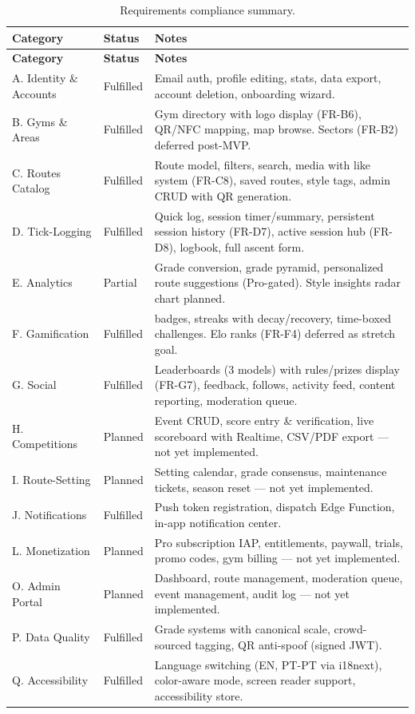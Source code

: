 \documentclass[12pt,a4paper]{report}
\renewcommand\_{\textunderscore\hspace{0pt}}
\begin{document}
\renewcommand{\arraystretch}{1.15}
\small
\begin{longtable}{l l >{\raggedright\arraybackslash}p{8.5cm}}
\caption{Requirements compliance summary.}\label{tab:compliance}\\
\hline
\textbf{Category} & \textbf{Status} & \textbf{Notes} \\
\hline
\endfirsthead
\hline
\textbf{Category} & \textbf{Status} & \textbf{Notes} \\
\hline
\endhead

A. Identity \& Accounts & Fulfilled & Email auth, profile editing, stats, data export, account deletion, onboarding wizard. \\
B. Gyms \& Areas & Fulfilled & Gym directory with logo display (FR-B6), QR/NFC mapping, map browse. Sectors (FR-B2) deferred post-MVP. \\
C. Routes Catalog & Fulfilled & Route model, filters, search, media with like system (FR-C8), saved routes, style tags, admin CRUD with QR generation. \\
D. Tick-Logging & Fulfilled & Quick log, session timer/summary, persistent session history (FR-D7), active session hub (FR-D8), logbook, full ascent form. \\
E. Analytics & Partial & Grade conversion, grade pyramid, personalized route suggestions (Pro-gated). Style insights radar chart planned. \\
F. Gamification & Fulfilled & 19 badges, streaks with decay/recovery, time-boxed challenges. Elo ranks (FR-F4) deferred as stretch goal. \\
G. Social & Fulfilled & Leaderboards (3 models) with rules/prizes display (FR-G7), feedback, follows, activity feed, content reporting, moderation queue. \\
H. Competitions & Planned & Event CRUD, score entry \& verification, live scoreboard with Realtime, CSV/PDF export --- not yet implemented. \\
I. Route-Setting & Planned & Setting calendar, grade consensus, maintenance tickets, season reset --- not yet implemented. \\
J. Notifications & Fulfilled & Push token registration, dispatch Edge Function, in-app notification center. \\
L. Monetization & Planned & Pro subscription IAP, entitlements, paywall, trials, promo codes, gym billing --- not yet implemented. \\
O. Admin Portal & Planned & Dashboard, route management, moderation queue, event management, audit log --- not yet implemented. \\
P. Data Quality & Fulfilled & Grade systems with canonical scale, crowd-sourced tagging, QR anti-spoof (signed JWT). \\
Q. Accessibility & Fulfilled & Language switching (EN, PT-PT via i18next), color-aware mode, screen reader support, accessibility store. \\
\hline
\end{longtable}
\normalsize
\end{document}
